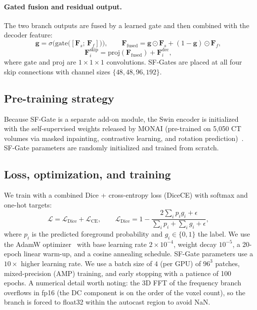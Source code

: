 \documentclass{article}
\begin{document}
\paragraph{Gated fusion and residual output.}
The two branch outputs are fused by a learned gate and then combined with the decoder feature:
\begin{equation}
  \mathbf{g} = \sigma\big(\mathrm{gate}\big([\mathbf{F}_{s};\,\mathbf{F}_{f}]\big)\big),
  \qquad
  \mathbf{F}_{\mathrm{fused}} = \mathbf{g}\odot\mathbf{F}_{s} + (1-\mathbf{g})\odot\mathbf{F}_{f},
\end{equation}
\begin{equation}
  \mathbf{F}^{\mathrm{skip}}_{i} = \mathrm{proj}(\mathbf{F}_{\mathrm{fused}}) + \mathbf{F}^{\mathrm{dec}}_{i},
\end{equation}
where $\mathrm{gate}$ and $\mathrm{proj}$ are $1\times1\times1$ convolutions. SF-Gates are placed at all four skip connections with channel sizes $\{48,48,96,192\}$.

\subsection{Pre-training strategy}

Because SF-Gate is a separate add-on module, the Swin encoder is initialized with the self-supervised weights released by MONAI (pre-trained on 5,050 CT volumes via masked inpainting, contrastive learning, and rotation prediction)~\citep{tang2022swinunetrssl}. SF-Gate parameters are randomly initialized and trained from scratch.

\subsection{Loss, optimization, and training}

We train with a combined Dice + cross-entropy loss (DiceCE) with softmax and one-hot targets:
\begin{equation}
  \mathcal{L} = \mathcal{L}_{\mathrm{Dice}} + \mathcal{L}_{\mathrm{CE}},
  \qquad
  \mathcal{L}_{\mathrm{Dice}} = 1 - \frac{2\sum_{i}p_{i}g_{i}+\epsilon}{\sum_{i}p_{i}+\sum_{i}g_{i}+\epsilon},
\end{equation}
where $p_i$ is the predicted foreground probability and $g_i\in\{0,1\}$ the label. We use the AdamW optimizer~\citep{loshchilov2017adamw} with base learning rate $2\times10^{-4}$, weight decay $10^{-5}$, a 20-epoch linear warm-up, and a cosine annealing schedule. SF-Gate parameters use a $10\times$ higher learning rate. We use a batch size of $4$ (per GPU) of $96^3$ patches, mixed-precision (AMP) training, and early stopping with a patience of 100 epochs. A numerical detail worth noting: the 3D FFT of the frequency branch overflows in fp16 (the DC component is on the order of the voxel count), so the branch is forced to float32 within the autocast region to avoid NaN.
\end{document}
